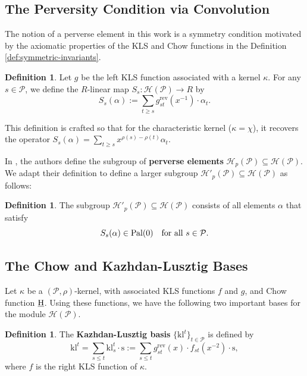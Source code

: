 \documentclass[11pt, letterpaper, english]{amsart}
\theoremstyle{teoremas}
\theoremstyle{definition}
\newtheorem{definition}[theorem]{Definition}
\newcommand{\rev}{\operatorname{rev}}
\newcommand{\calP}{\mathcal{P}}
\newcommand{\calH}{\mathcal{H}}
\newcommand{\chow}{\normalfont\text{\underline{H}}}
\newcommand{\Ebasis}[1]{\mathrm{#1}}
\newcommand{\klbasis}[1]{\mathrm{kl}^{#1}}
\newcommand{\klbasisSub}[2]{\mathrm{kl}^{#1}_{#2}}
\newcommand{\pal}{\normalfont\text{Pal}}
\begin{document}
\subsection{The Perversity Condition via Convolution}
The notion of a perverse element in this work is a symmetry condition
motivated by the axiomatic properties of the
KLS and Chow functions in the Definition \ref{def:symmetric-invariants}.

\begin{definition}
    Let \(g\) be the left KLS function associated with a kernel \(\kappa\). For any \(s \in \calP\), we define the \(R\)-linear map \(S_s: \calH(\calP) \to R\) by
    \[ S_s(\alpha) := \sum_{t \ge s} g^{\rev}_{st}(x^{-1}) \cdot \alpha_t. \]
\end{definition}

This definition is crafted so that for the characteristic kernel (\(\kappa=\chi\)),
it recovers the operator \(S_s(\alpha) = \sum_{t \ge s} x^{\rho(s)-\rho(t)} \alpha_t\).

In \cite{braden-vysogorets}, the authors define the subgroup of \textbf{perverse elements}
\(\calH_p(\calP) \subseteq \calH(\calP)\). We adapt their definition to define a
larger subgroup \(\calH'_p(\calP) \subseteq \calH(\calP)\) as follows:
\begin{definition}
    The subgroup \(\calH'_p(\calP) \subseteq \calH(\calP)\) consists of all elements \(\alpha\) that satisfy
    \[ S_s(\alpha) \in \pal(0) \quad \text{for all } s \in \calP. \]
\end{definition}

\subsection{The Chow and Kazhdan-Lusztig Bases}

Let \(\kappa\) be a \((\calP, \rho)\)-kernel, with associated KLS functions \(f\) and \(g\),
and Chow function \(\chow\). Using these functions, we have the following
two important bases for the module \(\calH(\calP)\).

\begin{definition}\label{def:kazhdan-lusztig-basis}
    The \textbf{Kazhdan-Lusztig basis} \(\{\klbasis{t}\}_{t \in \calP}\) is defined by
    \[ \klbasis{t} = \sum_{s \le t} \klbasisSub{t}{s}\cdot\Ebasis{s} := \sum_{s \le t} g^{\rev}_{st}(x) \cdot f_{st}(x^{-2}) \cdot \Ebasis{s},
    \]
    where \(f\) is the right KLS function of \(\kappa\).
\end{definition}
\end{document}
